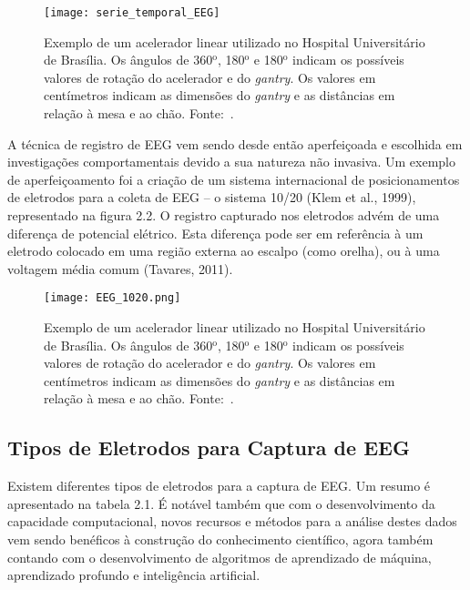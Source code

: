 \begin{figure}[h]
    \centering
    \texttt{[image: serie\_temporal\_EEG]}
    \caption[Exemplo de um acelerador linear utilizado no Hospital Universitário de Brasília.]{Exemplo de um acelerador linear utilizado no Hospital Universitário de Brasília. Os ângulos de 360${^{\textrm{o}} }$, 180${^{\textrm{o}} }$ e 180${^{\textrm{o}} }$ indicam os possíveis valores de rotação do acelerador e do \emph{gantry}. Os valores em centímetros indicam as dimensões do \emph{gantry} e as distâncias em relação à mesa e ao chão. Fonte:~\cite{Avelino2013}.}\label{fig:acelerador}
    \end{figure}

A técnica de registro de EEG vem sendo desde então aperfeiçoada e escolhida 
em investigações comportamentais devido a sua natureza não invasiva.
Um exemplo de aperfeiçoamento foi a criação de um sistema internacional de posicionamentos 
de eletrodos para a coleta de EEG – o sistema 10/20 (Klem et al., 1999), 
representado na figura 2.2. O registro capturado nos eletrodos advém de uma 
diferença de potencial elétrico. Esta diferença pode ser em referência à um 
eletrodo colocado em uma região externa ao escalpo (como orelha), 
ou à uma voltagem média comum (Tavares, 2011).

\begin{figure}[h]
    \centering
    \texttt{[image: EEG\_1020.png]}
    \caption[Exemplo de um acelerador linear utilizado no Hospital Universitário de Brasília.]{Exemplo de um acelerador linear utilizado no Hospital Universitário de Brasília. Os ângulos de 360${^{\textrm{o}} }$, 180${^{\textrm{o}} }$ e 180${^{\textrm{o}} }$ indicam os possíveis valores de rotação do acelerador e do \emph{gantry}. Os valores em centímetros indicam as dimensões do \emph{gantry} e as distâncias em relação à mesa e ao chão. Fonte:~\cite{Avelino2013}.}\label{fig:acelerador}
    \end{figure}

\subsection{Tipos de Eletrodos para Captura de EEG}

Existem diferentes tipos de eletrodos para a captura de EEG. Um resumo é apresentado na tabela 2.1. É notável também que com o desenvolvimento da capacidade computacional, novos recursos e métodos para a análise destes dados vem sendo benéficos à construção do conhecimento científico, agora também contando com o desenvolvimento de algoritmos de aprendizado de máquina, aprendizado profundo e inteligência artificial. 